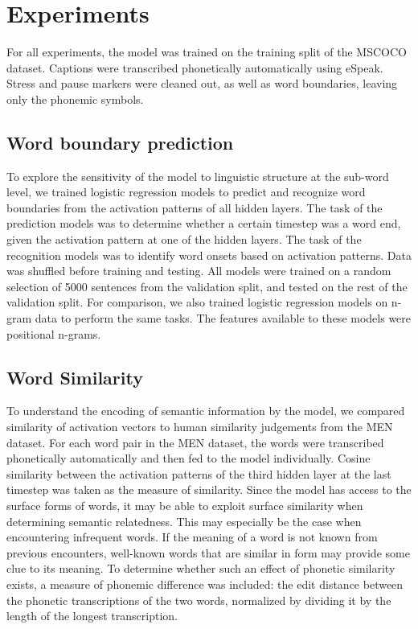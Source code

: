 \section{Experiments}
\label{sec:experiments}

For all experiments, the model was trained on the training split of the MSCOCO dataset. Captions were transcribed phonetically automatically using eSpeak. Stress and pause markers were cleaned out, as well as word boundaries, leaving only the phonemic symbols. %

\subsection{Word boundary prediction}
To explore the sensitivity of the model to linguistic structure at the sub-word level, we trained logistic regression models to predict and recognize word boundaries from the activation patterns of all hidden layers. The task of the prediction models was to determine whether a certain timestep was a word end, given the activation pattern at one of the hidden layers. The task of the recognition models was to identify word onsets based on activation patterns. Data was shuffled before training and testing. All models were trained on a random selection of 5000 sentences from the validation split, and tested on the rest of the validation split. %
For comparison, we also trained logistic regression models on n-gram data to perform the same tasks. The features available to these models were positional n-grams. %

\subsection{Word Similarity} %
To understand the encoding of semantic information by the model, we compared similarity of activation vectors to human similarity judgements from the MEN dataset. %
For each word pair in the MEN dataset, the words were transcribed phonetically automatically and then fed to the model individually. Cosine similarity between the activation patterns of the third hidden layer at the last timestep was taken as the measure of similarity. %
Since the model has access to the surface forms of words, it may be able to exploit surface similarity when determining semantic relatedness. This may especially be the case when encountering infrequent words. If the meaning of a word is not known from previous encounters, well-known words that are similar in form may provide some clue to its meaning. To determine whether such an effect of phonetic similarity exists, a measure of phonemic difference was included: the edit distance between the phonetic transcriptions of the two words, normalized by dividing it by the length of the longest transcription.


